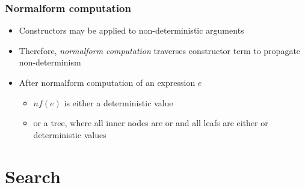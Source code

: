 \documentclass[%
,hyperref={pdfpagelabels=false}
,utf8
]{beamer}
\begin{document}
%
%
%
%
%

\begin{frame}[fragile]%
\frametitle{Normalform computation}
\begin{itemize}
  \item Constructors may be applied to non-deterministic arguments
  \item Therefore, \emph{normalform computation} traverses constructor
        term to propagate non-determinism
  \item After normalform computation of an expression $e$
  \begin{itemize}
    \item $nf(e)$ is either a deterministic value
    \item or a tree, where all inner nodes are  or
           and all leafs are either  or
          deterministic values
  \end{itemize}
\end{itemize}
\end{frame}



\section{Search}
\end{document}
